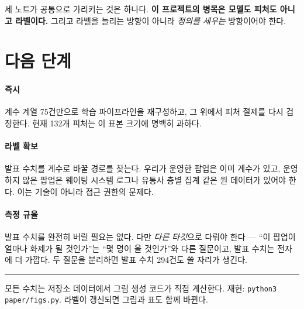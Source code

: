 \documentclass[10pt]{article}
\begin{document}
세 노트가 공통으로 가리키는 것은 하나다. \textbf{이 프로젝트의 병목은 모델도 피처도
아니고 라벨이다.} 그리고 라벨을 늘리는 방향이 아니라 \emph{정의를 세우는} 방향이어야 한다.

\section{다음 단계}

\paragraph{즉시}
계수 계열 75건만으로 학습 파이프라인을 재구성하고, 그 위에서 피처 절제를 다시 검정한다.
현재 132개 피처는 이 표본 크기에 명백히 과하다.

\paragraph{라벨 확보}
발표 수치를 계수로 바꿀 경로를 찾는다. 우리가 운영한 팝업은 이미 계수가 있고, 운영하지
않은 팝업은 웨이팅 시스템 로그나 유통사 층별 집계 같은 원 데이터가 있어야 한다.
이는 기술이 아니라 접근 권한의 문제다.

\paragraph{측정 규율}
발표 수치를 완전히 버릴 필요는 없다. 다만 \emph{다른 타깃}으로 다뤄야 한다 --- ``이 팝업이
얼마나 화제가 될 것인가''는 ``몇 명이 올 것인가''와 다른 질문이고, 발표 수치는 전자에
더 가깝다. 두 질문을 분리하면 발표 수치 294건도 쓸 자리가 생긴다.

\vspace{0.7em}
\hrule
\vspace{0.4em}
{\footnotesize\color{black!60}
모든 수치는 저장소 데이터에서 그림 생성 코드가 직접 계산한다.
재현: \texttt{python3 paper/figs.py}. 라벨이 갱신되면 그림과 표도 함께 바뀐다.}
\end{document}
